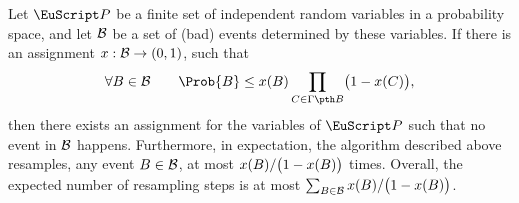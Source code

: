 \begin{theorem}
    Let $\Vars$ be a finite set of independent random variables in a
    probability space, and let $\mathcal{B}$ be a set of (bad) events
    determined by these variables. If there is an assignment
    $x:\mathcal{B} \rightarrow (0,1)$, such that
    \begin{equation*}
        \forall \BEvent \in \BEventSet%
        \qquad %
        \Prob{\BEvent} \leq x(\BEvent) \prod_{\BEventA \in
           \NbrX{\BEvent}} \bigl( 1 - x(\BEventA) \bigr),
    \end{equation*}
    then there exists an assignment for the variables of $\Vars$ such
    that no event in $\mathcal{B}$ happens. Furthermore, in
    expectation, the algorithm described above resamples, any event
    ${B} \in \mathcal{B}$, at most
    $x({B})/ \bigl(1-x({B}) \bigr)$ times. Overall, the
    expected number of resampling steps is at most
    $\sum_{{B}\in\mathcal{B}} x({B}) / \bigl(1-x({B})
    \bigr)$.
\end{theorem}

\ChapterEnd{}

